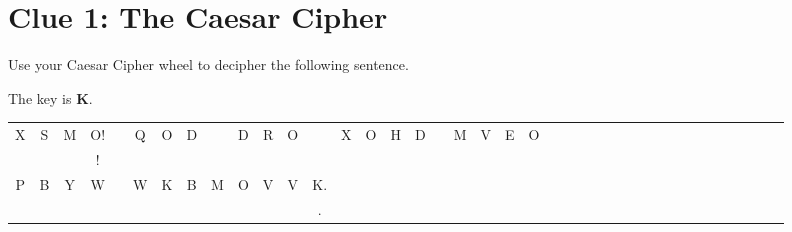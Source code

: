 \documentclass{article}
\begin{document}
\section*{Clue 1: The Caesar Cipher}

Use your Caesar Cipher wheel to decipher the following sentence. 

The key is \textbf{K}.

\vspace{5mm}

\begin{tabular}{*{39}{@{\hskip3pt}c}}
X & S & M & O! &   & Q & O & D &   & D & R & O &  & X & O & H & D &   & M & V & E & O \\ 
\underline{\hspace{.5cm}} & \underline{\hspace{.5cm}} & \underline{\hspace{.5cm}} & \underline{\hspace{.5cm}}! & 
\hspace{.3cm} & 
\underline{\hspace{.5cm}} & \underline{\hspace{.5cm}} & \underline{\hspace{.5cm}} & 
\hspace{.3cm} & 
\underline{\hspace{.5cm}} & \underline{\hspace{.5cm}} & \underline{\hspace{.5cm}} & 
\hspace{.3cm} &
\underline{\hspace{.5cm}} &  \underline{\hspace{.5cm}} & \underline{\hspace{.5cm}} & \underline{\hspace{.5cm}} & 
\hspace{.3cm} &
\underline{\hspace{.5cm}} & \underline{\hspace{.5cm}} & \underline{\hspace{.5cm}} & \underline{\hspace{.5cm}} \\
P & B & Y & W &   & W & K & B & M & O & V & V & K. \\
\underline{\hspace{.5cm}} & \underline{\hspace{.5cm}} & \underline{\hspace{.5cm}} & \underline{\hspace{.5cm}} &
\hspace{.3cm} &
\underline{\hspace{.5cm}} & \underline{\hspace{.5cm}} & \underline{\hspace{.5cm}} & \underline{\hspace{.5cm}} &
\underline{\hspace{.5cm}} & \underline{\hspace{.5cm}} & \underline{\hspace{.5cm}} & \underline{\hspace{.5cm}}. \\
\end{tabular}
\end{document}
